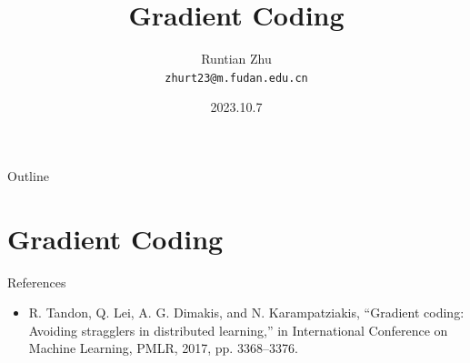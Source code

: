 \documentclass{beamer}
\title{Gradient Coding}
\author{Runtian Zhu \\ \texttt{zhurt23@m.fudan.edu.cn}}
\date{2023.10.7}
\begin{document}
\captionsetup[figure]{labelformat=empty}

\begin{frame}
  \titlepage
\end{frame}

\begin{frame}{Outline}
  \tableofcontents
\end{frame}

\section{Gradient Coding}

\begin{frame}{References}

\begin{itemize}
    \item R. Tandon, Q. Lei, A. G. Dimakis, and N. Karampatziakis, “Gradient coding: Avoiding stragglers in distributed learning,” in International Conference on Machine Learning, PMLR, 2017, pp. 3368–3376.
\end{itemize}


\end{frame}
\end{document}
